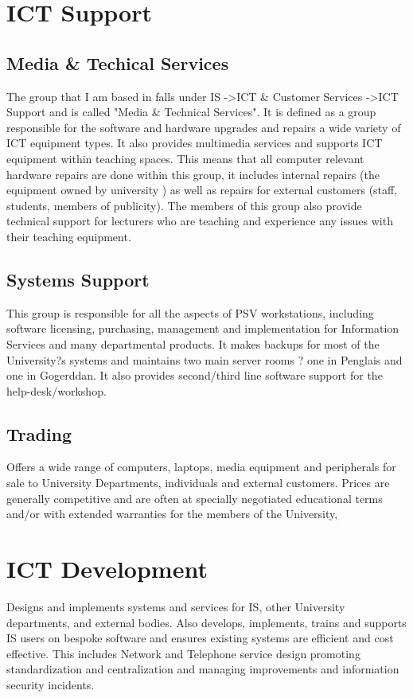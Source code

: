 \documentclass[10pt,a4paper,headinclude=true]{report}
\begin{document}
\section{ICT Support}
\subsection{Media \& Techical Services}
The group that I am based in falls under IS -\textgreater ICT \& Customer Services -\textgreater ICT Support and is called "Media \& Technical Services". It is defined as a group responsible for the software and hardware upgrades and repairs a wide variety of ICT equipment types. It also provides multimedia services and supports ICT equipment within teaching spaces. This means that all computer relevant hardware repairs are done within this group, it includes internal repairs (the equipment owned by university ) as well as repairs for external customers (staff, students, members of publicity). The members of this group also provide technical support for lecturers who are teaching and experience any issues with their teaching equipment.
\subsection{Systems Support}
This group is responsible for all the aspects of PSV workstations, including software licensing, purchasing, management and implementation for Information Services and many departmental products. It makes backups for most of the University?s systems and maintains two main server rooms ? one in Penglais and one in Gogerddan. It also provides second/third line software support for the help-desk/workshop.
\subsection{Trading}
Offers a wide range of computers, laptops, media equipment and peripherals for sale to University Departments, individuals and external customers. Prices are generally competitive and are often at specially negotiated educational terms and/or with extended warranties for the members of the University,
\section{ICT Development}
Designs and implements systems and services for IS, other University departments, and external bodies. Also develops, implements, trains and supports IS users on bespoke software and ensures existing systems are efficient and cost effective. This includes Network and Telephone service design promoting standardization and centralization and managing improvements and information security incidents.
\end{document}
